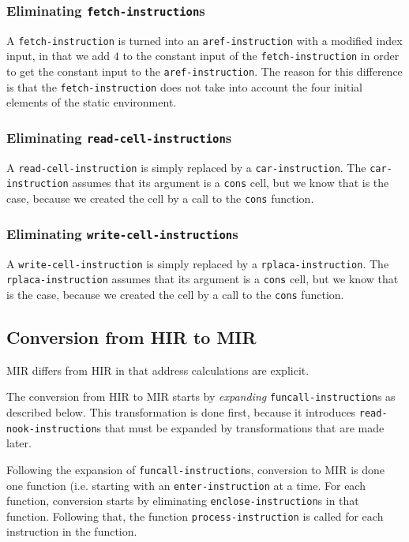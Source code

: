 \subsubsection{Eliminating \texttt{fetch-instruction}s}

A \texttt{fetch-instruction} is turned into an
\texttt{aref-instruction} with a modified index input, in that we add
$4$ to the constant input of the \texttt{fetch-instruction} in order
to get the constant input to the \texttt{aref-instruction}.  The
reason for this difference is that the \texttt{fetch-instruction} does
not take into account the four initial elements of the static
environment.

\subsubsection{Eliminating \texttt{read-cell-instruction}s}

A \texttt{read-cell-instruction} is simply replaced by a
\texttt{car-instruction}.  The \texttt{car-instruction} assumes that
its argument is a \texttt{cons} cell, but we know that is the case,
because we created the cell by a call to the \texttt{cons} function.

\subsubsection{Eliminating \texttt{write-cell-instruction}s}

A \texttt{write-cell-instruction} is simply replaced by a
\texttt{rplaca-instruction}.  The \texttt{rplaca-instruction} assumes
that its argument is a \texttt{cons} cell, but we know that is the
case, because we created the cell by a call to the \texttt{cons}
function.

\subsection{Conversion from HIR to MIR}

MIR differs from HIR in that address calculations are explicit.

The conversion from HIR to MIR starts by \emph{expanding}
\texttt{funcall-instruction}s as described below.  This transformation
is done first, because it introduces \texttt{read-nook-instruction}s
that must be expanded by transformations that are made later.

Following the expansion of \texttt{funcall-instruction}s, conversion
to MIR is done one function (i.e. starting with an
\texttt{enter-instruction} at a time.  For each function, conversion
starts by eliminating \texttt{enclose-instruction}s in that function.
Following that, the function \texttt{process-instruction} is called
for each instruction in the function.

